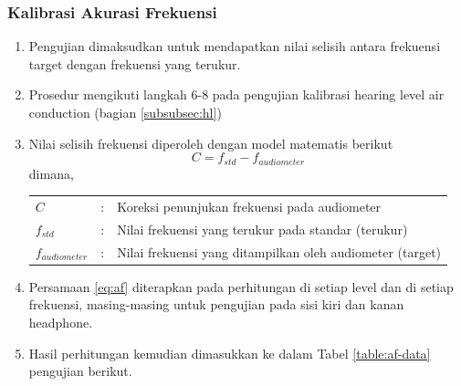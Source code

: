 \documentclass{article}
\begin{document}
	\subsubsection{Kalibrasi Akurasi Frekuensi}
	\begin{enumerate}
		\item Pengujian dimaksudkan untuk mendapatkan nilai selisih antara frekuensi target dengan frekuensi yang terukur. 
		\item Prosedur mengikuti langkah 6-8 pada pengujian kalibrasi hearing level air conduction (bagian \ref{subsubsec:hl})
		\item Nilai selisih frekuensi diperoleh dengan model matematis berikut
		\begin{equation}
			\label{eq:af}
			C = f_{std} - f_{audiometer}
		\end{equation}
		dimana, 
		
		\begin{tabular}{p{} p{} p{}}
			\(C\) & : & Koreksi penunjukan frekuensi pada audiometer \\
			\(f_{std}\) & : & Nilai frekuensi yang terukur pada standar (terukur) \\
			\(f_{audiometer}\) & : & Nilai frekuensi yang ditampilkan oleh audiometer (target) \\
		\end{tabular}
	
		\item Persamaan \ref{eq:af} diterapkan pada perhitungan di setiap level dan di setiap frekuensi, masing-masing untuk pengujian pada sisi kiri dan kanan headphone.
		
		\item Hasil perhitungan kemudian dimasukkan ke dalam Tabel \ref{table:af-data} pengujian berikut.
		

\end{enumerate}
\end{document}
